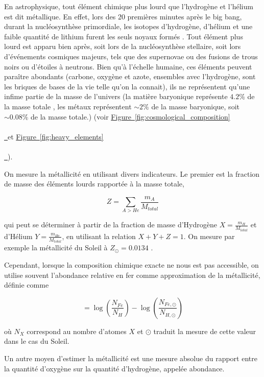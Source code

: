 \documentclass[12pt, a4paper]{article}
\newcommand*{\figref}[2][]{%
  \hyperref[{#2}]{%
    Figure~\ref*{#2}%
    \ifx\\#1\\%
    \else
      \,#1%
    \fi
  }%
}
\begin{document}
En astrophysique, tout élément chimique plus lourd que l'hydrogène et l'hélium est dit métallique. En effet, lors des 20 premières minutes après le big bang, durant la nucléosynthèse primordiale, les isotopes d'hydrogène, d'hélium et une faible quantité de lithium furent les seuls noyaux formés \parencite{2017IJMPE..2641002C}. Tout élément plus lourd est apparu bien après, soit lors de la nucléosynthèse stellaire, soit lors d'événements cosmiques majeurs, tels que des supernovae ou des fusions de trous noirs ou d'étoiles à neutrons. Bien qu'à l'échelle humaine, ces éléments peuvent paraître abondants (carbone, oxygène et azote, ensembles avec l'hydrogène, sont les briques de bases de la vie telle qu'on la connait), ils ne représentent qu'une infime partie de la masse de l'univers (la matière baryonique représente $4.2 \%$ de la masse totale \parencite{2024JCAP...06..006S}, les métaux représentent $\sim 2\%$ de la masse baryonique, soit $\sim 0.08\%$ de la masse totale.) (voir \figref{fig:cosmological_composition} et \figref{fig:heavy_elements}).

On mesure la métallicité en utilisant divers indicateurs. Le premier est la fraction de masse des éléments lourds rapportée à la masse totale,

\begin{equation}
  Z = \sum_{A > He} \frac{m_A}{M_{total}}
\end{equation}

qui peut se déterminer à partir de la fraction de masse d'Hydrogène $X = \frac{m_H}{M_{total}}$ et d'Hélium $Y = \frac{m_{He}}{M_{total}}$, en utilisant la relation $X + Y + Z = 1$. On mesure par exemple la métallicité du Soleil à $Z_\odot = 0.0134$ \parencite{2009ARA&A..47..481A}.

Cependant, lorsque la composition chimique exacte ne nous est pas accessible, on utilise souvent l'abondance relative en fer comme approximation de la métallicité, définie comme 

\begin{equation}
  [Fe/H] = \log(\frac{N_{Fe}}{N_H}) - \log(\frac{N_{Fe, \odot}}{N_{H, \odot}})
\end{equation}

où $N_{X}$ correspond au nombre d'atomes $X$ et $\odot$ traduit la mesure de cette valeur dans le cas du Soleil.

Un autre moyen d'estimer la métallicité est une mesure absolue du rapport entre la quantité d'oxygène sur la quantité d'hydrogène, appelée abondance.
\end{document}
